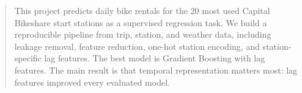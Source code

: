 \begin{abstract}
This project predicts daily bike rentals for the 20 most used Capital Bikeshare start stations as a supervised regression task. We build a reproducible pipeline from trip, station, and weather data, including leakage removal, feature reduction, one-hot station encoding, and station-specific lag features. The best model is Gradient Boosting with lag features. The main result is that temporal representation matters most: lag features improved every evaluated model.
\end{abstract}